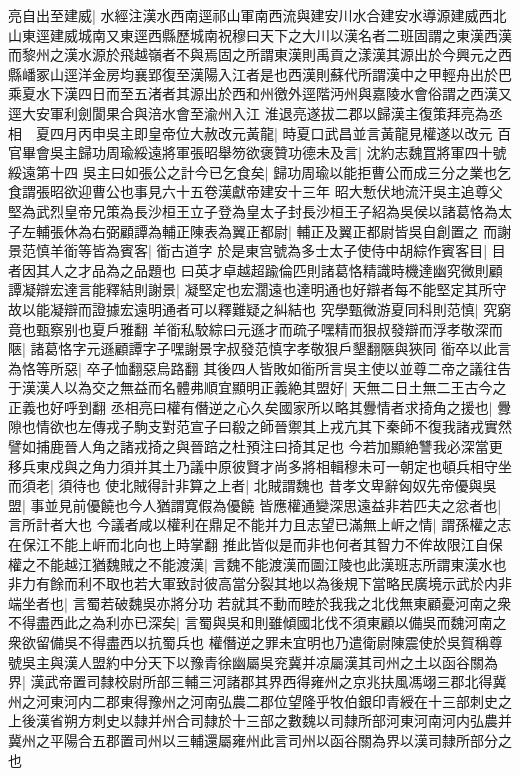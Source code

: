 亮自出至建威|{
	水經注漢水西南逕祁山軍南西流與建安川水合建安水導源建威西北山東逕建威城南又東逕西縣歷城南祝穆曰天下之大川以漢名者二班固謂之東漢西漢而黎州之漢水源於飛越嶺者不與焉固之所謂東漢則禹貢之漾漢其源出於今興元之西縣嶓冢山逕洋金房均襄郢復至漢陽入江者是也西漢則蘇代所謂漢中之甲輕舟出於巴乘夏水下漢四日而至五渚者其源出於西和州徼外逕階沔州與嘉陵水會俗謂之西漢又逕大安軍利劍閬果合與涪水會至渝州入江}
淮退亮遂拔二郡以歸漢主復策拜亮為丞相　夏四月丙申吳主即皇帝位大赦改元黃龍|{
	時夏口武昌並言黃龍見權遂以改元}
百官畢會吳主歸功周瑜綏遠將軍張昭舉笏欲褒贊功德未及言|{
	沈約志魏罝將軍四十號綏遠第十四}
吳主曰如張公之計今已乞食矣|{
	歸功周瑜以能拒曹公而成三分之業也乞食謂張昭欲迎曹公也事見六十五卷漢獻帝建安十三年}
昭大慙伏地流汗吳主追尊父堅為武烈皇帝兄策為長沙桓王立子登為皇太子封長沙桓王子紹為吳侯以諸葛恪為太子左輔張休為右弼顧譚為輔正陳表為翼正都尉|{
	輔正及翼正都尉皆吳自創置之}
而謝景范慎羊衜等皆為賓客|{
	衜古道字}
於是東宫號為多士太子使侍中胡綜作賓客目|{
	目者因其人之才品為之品題也}
曰英才卓越超踰倫匹則諸葛恪精識時機達幽究微則顧譚凝辯宏達言能釋結則謝景|{
	凝堅定也宏濶遠也達明通也好辯者每不能堅定其所守故以能凝辯而證據宏遠明通者可以釋難疑之糾結也}
究學甄微游夏同科則范慎|{
	究窮竟也甄察别也夏戶雅翻}
羊衜私駮綜曰元遜才而疏子嘿精而狠叔發辯而浮孝敬深而陿|{
	諸葛恪字元遜顧譚字子嘿謝景字叔發范慎字孝敬狠戶墾翻陿與狹同}
衜卒以此言為恪等所惡|{
	卒子恤翻惡烏路翻}
其後四人皆敗如衜所言吳主使以並尊二帝之議往告于漢漢人以為交之無益而名體弗順宜顯明正義絶其盟好|{
	天無二日土無二王古今之正義也好呼到翻}
丞相亮曰權有僭逆之心久矣國家所以略其釁情者求掎角之援也|{
	釁隙也情欲也左傳戎子駒支對范宣子曰殽之師晉禦其上戎亢其下秦師不復我諸戎實然譬如捕鹿晉人角之諸戎掎之與晉踣之杜預注曰掎其足也}
今若加顯絶讐我必深當更移兵東戍與之角力須并其土乃議中原彼賢才尚多將相輯穆未可一朝定也頓兵相守坐而須老|{
	須待也}
使北賊得計非算之上者|{
	北賊謂魏也}
昔孝文卑辭匈奴先帝優與吳盟|{
	事並見前優饒也今人猶謂寛假為優饒}
皆應權通變深思遠益非若匹夫之忿者也|{
	言所計者大也}
今議者咸以權利在鼎足不能并力且志望已滿無上㟁之情|{
	謂孫權之志在保江不能上㟁而北向也上時掌翻}
推此皆似是而非也何者其智力不侔故限江自保權之不能越江猶魏賊之不能渡漢|{
	言魏不能渡漢而圖江陵也此漢班志所謂東漢水也}
非力有餘而利不取也若大軍致討彼高當分裂其地以為後規下當略民廣境示武於内非端坐者也|{
	言蜀若破魏吳亦將分功}
若就其不動而睦於我我之北伐無東顧憂河南之衆不得盡西此之為利亦已深矣|{
	言蜀與吳和則雖傾國北伐不須東顧以備吳而魏河南之衆欲留備吳不得盡西以抗蜀兵也}
權僭逆之罪未宜明也乃遣衛尉陳震使於吳賀稱尊號吳主與漢人盟約中分天下以豫青徐幽屬吳兖冀并凉屬漢其司州之土以函谷關為界|{
	漢武帝置司隸校尉所部三輔三河諸郡其界西得雍州之京兆扶風馮翊三郡北得冀州之河東河内二郡東得豫州之河南弘農二郡位望隆乎牧伯銀印青綬在十三部刺史之上後漢省朔方刺史以隸并州合司隸於十三部之數魏以司隸所部河東河南河内弘農并冀州之平陽合五郡置司州以三輔還屬雍州此言司州以函谷關為界以漢司隸所部分之也}
